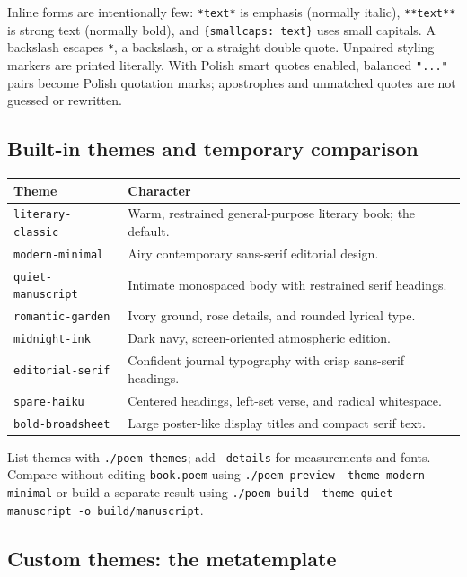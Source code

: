 \documentclass[11pt,a4paper]{article}
\newcommand{\code}[1]{\texttt{#1}}
\begin{document}
Inline forms are intentionally few: \code{*text*} is emphasis (normally italic),
\code{**text**} is strong text (normally bold), and \code{\{smallcaps: text\}}
uses small capitals. A backslash escapes \code{*}, a backslash, or a straight
double quote. Unpaired styling markers are printed literally. With Polish smart
quotes enabled, balanced \code{"..."} pairs become Polish quotation marks;
apostrophes and unmatched quotes are not guessed or rewritten.

\subsection{Built-in themes and temporary comparison}

\begin{longtable}{@{}L{0.25\textwidth}L{0.69\textwidth}@{}}
\toprule
\textbf{Theme} & \textbf{Character} \\
\midrule
\endhead
\code{literary-classic} & Warm, restrained general-purpose literary book; the default. \\
\code{modern-minimal} & Airy contemporary sans-serif editorial design. \\
\code{quiet-manuscript} & Intimate monospaced body with restrained serif headings. \\
\code{romantic-garden} & Ivory ground, rose details, and rounded lyrical type. \\
\code{midnight-ink} & Dark navy, screen-oriented atmospheric edition. \\
\code{editorial-serif} & Confident journal typography with crisp sans-serif headings. \\
\code{spare-haiku} & Centered headings, left-set verse, and radical whitespace. \\
\code{bold-broadsheet} & Large poster-like display titles and compact serif text. \\
\bottomrule
\end{longtable}

List themes with \code{./poem themes}; add \code{--details} for measurements and
fonts. Compare without editing \code{book.poem} using
\code{./poem preview --theme modern-minimal} or build a separate result using
\code{./poem build --theme quiet-manuscript -o build/manuscript}.

\subsection{Custom themes: the metatemplate}
\end{document}
